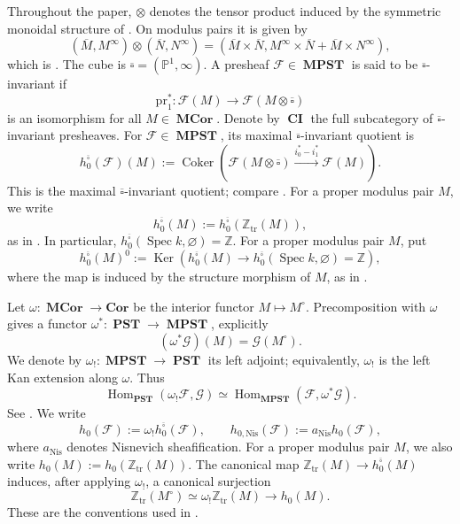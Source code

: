 \documentclass[a4paper,12pt,reqno]{amsart}
\numberwithin{equation}{section}
\theoremstyle{definition}
\newcommand{\Z}{\mathbb{Z}}
\newcommand{\bP}{\mathbb{P}}
\newcommand{\cF}{\mathcal{F}}
\DeclareMathOperator{\Coker}{Coker}
\DeclareMathOperator{\Hom}{Hom}
\DeclareMathOperator{\Ker}{Ker}
\DeclareMathOperator{\Spec}{Spec}
\newcommand{\bcube}{{\overline{\square}}}
\newcommand{\CI}{\operatorname{\mathbf{CI}}}
\newcommand{\MPST}{\operatorname{\mathbf{MPST}}}
\newcommand{\PST}{\operatorname{\mathbf{PST}}}
\newcommand{\Cork}{\mathbf{Cor}}
\newcommand{\MCor}{\operatorname{\mathbf{MCor}}}
\newcommand{\Ztr}{\Z_{\mathrm{tr}}}
\newcommand{\Nis}{\mathrm{Nis}}
\begin{document}
Throughout the paper, $\otimes$ denotes the tensor product induced by the
symmetric monoidal structure of \cite[Equation~(2.5.1)]{RSY22}.  On
modulus pairs it is given by
\begin{equation}\label{eq:sum}
 (\overline M,M^\infty)\otimes(\overline N,N^\infty)
 =
 (\overline M\times\overline N,
 M^\infty\times\overline N+\overline M\times N^\infty),
\end{equation}
which is \cite[Equation~(2.5.1)]{RSY22}.  The cube is
$\bcube=(\bP^1,\infty)$.  
A presheaf $\cF\in \MPST$ is said to be $\bcube$-invariant if 
\[
\mathrm{pr}_1^*: \cF(M)\to\cF(M\otimes \bcube)
\]
is an isomorphism for all $M\in \MCor$.
Denote by $\CI$ the full subcategory of $\bcube$-invariant presheaves.
For $\mathcal F\in\MPST$, its maximal
$\bcube$-invariant quotient is
\begin{equation}\label{eq:h0c}
 h_0^{\bcube}(\mathcal F)(M)
 :=\Coker\left(
 \mathcal F(M\otimes\bcube)
 \xrightarrow{i_0^*-i_1^*}
 \mathcal F(M)
 \right).
\end{equation}
This is the maximal $\bcube$-invariant quotient; compare
\cite[Definition~5.3 and Remark~5.4]{HS25}.  For a proper modulus pair
$M$, we write
\begin{equation}\label{eq:h0pair}
 h_0^{\bcube}(M):=h_0^{\bcube}(\Ztr(M)),
\end{equation}
as in \cite[Section~3.6, especially Equation~(3.6.1)]{RSY22}.  In
particular, $h_0^{\bcube}(\Spec k,\varnothing)=\Z$.
For a proper modulus pair $M$, put
\begin{equation}\label{eq:h0red}
 h_0^{\bcube}(M)^0
 :=\Ker\left(
 h_0^{\bcube}(M)\to h_0^{\bcube}(\Spec k,\varnothing)=\Z
 \right),
\end{equation}
where the map is induced by the structure morphism of $M$, as in
\cite[Equation~(5.1.1)]{RSY22}.

Let $\omega:\MCor\to\Cork$ be the interior functor
$M\mapsto M^\circ$.  Precomposition with $\omega$ gives a functor
$\omega^*:\PST\to\MPST$, explicitly
\begin{equation}\label{eq:omstar}
 (\omega^*\mathcal G)(M)=\mathcal G(M^\circ).
\end{equation}
We denote by $\omega_!:\MPST\to\PST$ its left adjoint; equivalently,
$\omega_!$ is the left Kan extension along $\omega$.  Thus
\begin{equation}\label{eq:ombang}
 \Hom_{\PST}(\omega_!\mathcal F,\mathcal G)
 \simeq
 \Hom_{\MPST}(\mathcal F,\omega^*\mathcal G).
\end{equation}
See \cite[Sections~1.3 and~3.5]{RSY22}.  We write
\begin{equation}\label{eq:h0nis}
 h_0(\mathcal F):=\omega_!h_0^{\bcube}(\mathcal F),
 \qquad
 h_{0,\Nis}(\mathcal F):=a_{\Nis}h_0(\mathcal F),
\end{equation}
where $a_{\Nis}$ denotes Nisnevich sheafification.  For a proper modulus
pair $M$, we also write $h_0(M):=h_0(\Ztr(M))$.  The canonical map
$\Ztr(M)\to h_0^{\bcube}(M)$ induces, after applying $\omega_!$, a
canonical surjection
\begin{equation}\label{eq:Ztrh0}
 \Ztr(M^\circ)\simeq\omega_!\Ztr(M)\to h_0(M).
\end{equation}
These are the conventions used in
\cite[Section~3.10 and Equation~(3.15.1)]{RSY22}.
\end{document}
